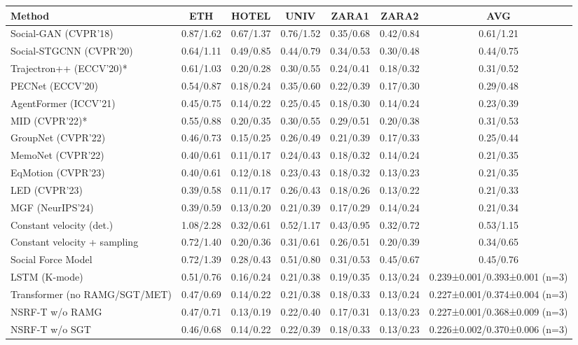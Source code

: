 \begin{tabular}{lcccccc}\toprule
Method & ETH & HOTEL & UNIV & ZARA1 & ZARA2 & AVG \\ \midrule
Social-GAN (CVPR'18) & 0.87/1.62 & 0.67/1.37 & 0.76/1.52 & 0.35/0.68 & 0.42/0.84 & 0.61/1.21 \\
Social-STGCNN (CVPR'20) & 0.64/1.11 & 0.49/0.85 & 0.44/0.79 & 0.34/0.53 & 0.30/0.48 & 0.44/0.75 \\
Trajectron++ (ECCV'20)* & 0.61/1.03 & 0.20/0.28 & 0.30/0.55 & 0.24/0.41 & 0.18/0.32 & 0.31/0.52 \\
PECNet (ECCV'20) & 0.54/0.87 & 0.18/0.24 & 0.35/0.60 & 0.22/0.39 & 0.17/0.30 & 0.29/0.48 \\
AgentFormer (ICCV'21) & 0.45/0.75 & 0.14/0.22 & 0.25/0.45 & 0.18/0.30 & 0.14/0.24 & 0.23/0.39 \\
MID (CVPR'22)* & 0.55/0.88 & 0.20/0.35 & 0.30/0.55 & 0.29/0.51 & 0.20/0.38 & 0.31/0.53 \\
GroupNet (CVPR'22) & 0.46/0.73 & 0.15/0.25 & 0.26/0.49 & 0.21/0.39 & 0.17/0.33 & 0.25/0.44 \\
MemoNet (CVPR'22) & 0.40/0.61 & 0.11/0.17 & 0.24/0.43 & 0.18/0.32 & 0.14/0.24 & 0.21/0.35 \\
EqMotion (CVPR'23) & 0.40/0.61 & 0.12/0.18 & 0.23/0.43 & 0.18/0.32 & 0.13/0.23 & 0.21/0.35 \\
LED (CVPR'23) & 0.39/0.58 & 0.11/0.17 & 0.26/0.43 & 0.18/0.26 & 0.13/0.22 & 0.21/0.33 \\
MGF (NeurIPS'24) & 0.39/0.59 & 0.13/0.20 & 0.21/0.39 & 0.17/0.29 & 0.14/0.24 & 0.21/0.34 \\
\midrule
Constant velocity (det.) & 1.08/2.28 & 0.32/0.61 & 0.52/1.17 & 0.43/0.95 & 0.32/0.72 & 0.53/1.15 \\
Constant velocity + sampling & 0.72/1.40 & 0.20/0.36 & 0.31/0.61 & 0.26/0.51 & 0.20/0.39 & 0.34/0.65 \\
Social Force Model & 0.72/1.39 & 0.28/0.43 & 0.51/0.80 & 0.31/0.53 & 0.45/0.67 & 0.45/0.76 \\
LSTM (K-mode) & 0.51/0.76 & 0.16/0.24 & 0.21/0.38 & 0.19/0.35 & 0.13/0.24 & 0.239±0.001/0.393±0.001 (n=3) \\
Transformer (no RAMG/SGT/MET) & 0.47/0.69 & 0.14/0.22 & 0.21/0.38 & 0.18/0.33 & 0.13/0.24 & 0.227±0.001/0.374±0.004 (n=3) \\
NSRF-T w/o RAMG & 0.47/0.71 & 0.13/0.19 & 0.22/0.40 & 0.17/0.31 & 0.13/0.23 & 0.227±0.001/0.368±0.009 (n=3) \\
NSRF-T w/o SGT & 0.46/0.68 & 0.14/0.22 & 0.22/0.39 & 0.18/0.33 & 0.13/0.23 & 0.226±0.002/0.370±0.006 (n=3) \\

\end{tabular}
